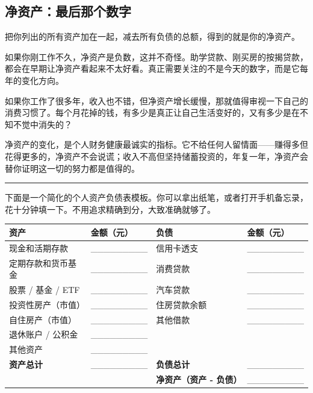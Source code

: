 \documentclass[a4paper,11pt,oneside,fontset=none,UTF8,zihao=-4]{ctexbook}
\begin{document}
\subsection{净资产：最后那个数字}\label{ux51c0ux8d44ux4ea7ux6700ux540eux90a3ux4e2aux6570ux5b57}

把你列出的所有资产加在一起，减去所有负债的总额，得到的就是你的净资产。

如果你刚工作不久，净资产是负数，这并不奇怪。助学贷款、刚买房的按揭贷款，都会在早期让净资产看起来不太好看。真正需要关注的不是今天的数字，而是它每年的变化方向。

如果你工作了很多年，收入也不错，但净资产增长缓慢，那就值得审视一下自己的消费习惯了。每个月花掉的钱，有多少是真正让自己生活变好的，又有多少是在不知不觉中消失的？

净资产的变化，是个人财务健康最诚实的指标。它不给任何人留情面------赚得多但花得更多的，净资产不会说谎；收入不高但坚持储蓄投资的，年复一年，净资产会替你证明这一切的努力都是值得的。

\begin{center}{\color{dh-bronze}\rule{0.2\textwidth}{0.5pt}}\end{center}

下面是一个简化的个人资产负债表模板。你可以拿出纸笔，或者打开手机备忘录，花十分钟填一下。不用追求精确到分，大致准确就够了。

\begin{longtable}[]{@{}llll@{}}
\toprule\noalign{}\rowcolor{dh-pink!25}
资产 & 金额（元） & 负债 & 金额（元） \\
\midrule\noalign{}
\endhead
\bottomrule\noalign{}
\endlastfoot
现金和活期存款 & \_\_\_\_\_\_\_\_\_ & 信用卡透支 & \_\_\_\_\_\_\_\_\_ \\
定期存款和货币基金 & \_\_\_\_\_\_\_\_\_ & 消费贷款 &
\_\_\_\_\_\_\_\_\_ \\
股票 / 基金 / ETF & \_\_\_\_\_\_\_\_\_ & 汽车贷款 &
\_\_\_\_\_\_\_\_\_ \\
投资性房产（市值） & \_\_\_\_\_\_\_\_\_ & 住房贷款余额 &
\_\_\_\_\_\_\_\_\_ \\
自住房产（市值） & \_\_\_\_\_\_\_\_\_ & 其他借款 & \_\_\_\_\_\_\_\_\_ \\
退休账户 / 公积金 & \_\_\_\_\_\_\_\_\_ & & \\
其他资产 & \_\_\_\_\_\_\_\_\_ & & \\
\textbf{资产总计} & \_\_\_\_\_\_\_\_\_ & \textbf{负债总计} &
\_\_\_\_\_\_\_\_\_ \\
& & \textbf{净资产（资产 - 负债）} & \_\_\_\_\_\_\_\_\_ \\
\end{longtable}
\end{document}
